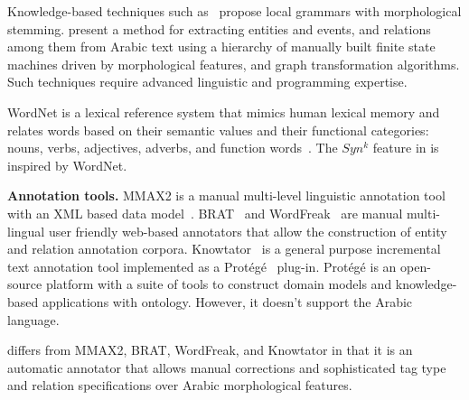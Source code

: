 Knowledge-based techniques such 
as~\cite{zaghouani2010adapting,traboulsi2009arabic} propose local grammars with morphological stemming.%
\cite{ZaMaHaCicling2012Entity} present a method for extracting entities and events, and relations among them from Arabic text using a hierarchy of manually built 
finite state machines driven by morphological features, 
and graph transformation algorithms. 
Such techniques require advanced linguistic and programming expertise. 

WordNet is a lexical reference system that mimics human lexical memory 
and relates words based on their semantic values and their functional 
categories: nouns, verbs, adjectives, adverbs, and function words~\cite{intro}.
The $Syn^k$ feature in \framework is inspired by WordNet.

{\bf Annotation tools.}
MMAX2 is a manual multi-level linguistic annotation tool with an XML 
based data model~\cite{mmax2}.
BRAT~\cite{brat} and WordFreak~\cite{wordfreak} are manual 
multi-lingual user friendly web-based annotators that allow the construction 
of entity and relation annotation corpora.
Knowtator~\cite{ogren2006knowtator} is a general purpose incremental text annotation tool 
implemented as a Prot\'eg\'e~\cite{gennari2003evolution} plug-in. 
Prot\'eg\'e is an open-source platform with a suite of tools to construct domain models and knowledge-based applications with ontology. 
However, it doesn't support the Arabic language.

\framework differs from MMAX2, BRAT, WordFreak, and Knowtator in that it is 
an automatic annotator that allows manual corrections 
and sophisticated tag type and relation specifications over
Arabic morphological features.

